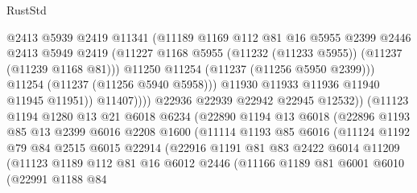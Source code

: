 \begin{lexlean}{RustStd}
\begin{coremodule}
                            @2413
                            @5939
                            @2419
                            @11341
                            (@11189
                              @1169
                              @112
                              @81
                              @16
                              @5955
                              @2399
                              @2446
                              @2413
                              @5949
                              @2419
                              (@11227
                                @1168
                                @5955
                                (@11232 (@11233 @5955))
                                (@11237 (@11239 @1168 @81)))
                              @11250
                              @11254
                              (@11237 (@11256 @5950 @2399)))
                            @11254
                            (@11237 (@11256 @5940 @5958)))
                          @11930
                          @11933
                          @11936
                          @11940
                          @11945
                          @11951))
                      @11407))))
              @22936
              @22939
              @22942
              @22945
              @12532))
          (@11123
            @1194
            @1280
            @13
            @21
            @6018
            @6234
            (@22890
              @1194
              @13
              @6018
              (@22896
                @1193
                @85
                @13
                @2399
                @6016
                @2208
                @1600
                (@11114
                  @1193
                  @85
                  @6016
                  (@11124
                    @1192
                    @79
                    @84
                    @2515
                    @6015
                    @22914
                    (@22916
                      @1191
                      @81
                      @83
                      @2422
                      @6014
                      @11209
                      (@11123
                        @1189
                        @112
                        @81
                        @16
                        @6012
                        @2446
                        (@11166
                          @1189
                          @81
                          @6001
                          @6010
                          (@22991
                            @1188
                            @84

\end{coremodule}
\end{lexlean}
